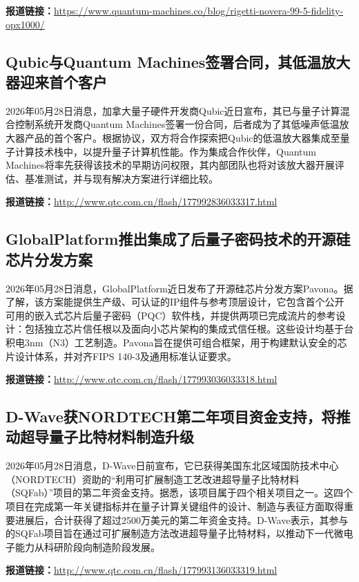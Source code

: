 \documentclass[12pt,a4paper]{ctexart}
\begin{document}
\noindent\textbf{报道链接：}\url{https://www.quantum-machines.co/blog/rigetti-novera-99-5-fidelity-opx1000/ }

\subsection{ Qubic与Quantum Machines签署合同，其低温放大器迎来首个客户 }

2026年05月28日消息，加拿大量子硬件开发商Qubic近日宣布，其已与量子计算混合控制系统开发商Quantum Machines签署一份合同，后者成为了其低噪声低温放大器产品的首个客户。根据协议，双方将合作探索把Qubic的低温放大器集成至量子计算技术栈中，以提升量子计算机性能。作为集成合作伙伴，Quantum Machines将率先获得该技术的早期访问权限，其内部团队也将对该放大器开展评估、基准测试，并与现有解决方案进行详细比较。

\noindent\textbf{报道链接：}\url{http://www.qtc.com.cn/flash/177992836033317.html }

\subsection{ GlobalPlatform推出集成了后量子密码技术的开源硅芯片分发方案 }

2026年05月28日消息，GlobalPlatform近日发布了开源硅芯片分发方案Pavona。据了解，该方案能提供生产级、可认证的IP组件与参考顶层设计，它包含首个公开可用的嵌入式芯片后量子密码（PQC）软件栈，并提供两项已完成流片的参考设计：包括独立芯片信任根以及面向小芯片架构的集成式信任根。这些设计均基于台积电3nm（N3）工艺制造。Pavona旨在提供可组合框架，用于构建默认安全的芯片设计体系，并对齐FIPS 140-3及通用标准认证要求。

\noindent\textbf{报道链接：}\url{http://www.qtc.com.cn/flash/177993036033318.html }

\subsection{ D-Wave获NORDTECH第二年项目资金支持，将推动超导量子比特材料制造升级 }

2026年05月28日消息，D-Wave日前宣布，它已获得美国东北区域国防技术中心（NORDTECH）资助的“利用可扩展制造工艺改进超导量子比特材料（SQFab）”项目的第二年资金支持。据悉，该项目属于四个相关项目之一。这四个项目在完成第一年关键指标并在量子计算关键组件的设计、制造与表征方面取得重要进展后，合计获得了超过2500万美元的第二年资金支持。D-Wave表示，其参与的SQFab项目旨在通过可扩展制造方法改进超导量子比特材料，以推动下一代微电子能力从科研阶段向制造阶段发展。

\noindent\textbf{报道链接：}\url{http://www.qtc.com.cn/flash/177993136033319.html }
\end{document}
